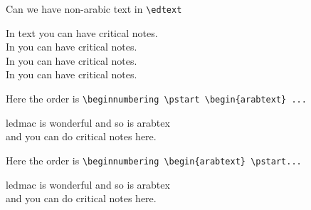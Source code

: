 \documentclass[12pt]{article}
\begin{document}
Can we have non-arabic text in \verb?\edtext?

\beginnumbering
\pstart
\noindent
In  text you
can have critical notes. \\
In  you
can have critical notes. \\
In  you
can have critical notes. \\
In  you
can have critical notes.
\pend
\endnumbering

Here the order is \verb?\beginnumbering \pstart \begin{arabtext} ...?

\beginnumbering
\pstart
\begin{arabtext}
ledmac is wonderful and so
 is arabtex\\
and  you
can do critical notes here.
\end{arabtext}
\pend
\endnumbering

Here the order is \verb?\beginnumbering \begin{arabtext} \pstart...?

\arablnumrep
\beginnumbering
\begin{arabtext}
\pstart
ledmac is wonderful and so
 is arabtex\\
and  you
can do critical notes here.
\pend
\end{arabtext}
\endnumbering
\restorelnumrep
\end{document}
